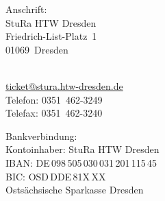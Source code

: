 \documentclass[%
	ngerman,	%
	parskip=half,
	paper=a4,%
	pagesize=auto	%
	]{scrartcl}
\begin{document}
\noindent
\parbox{.3\linewidth}{
Anschrift:\\
StuRa HTW Dresden\\
Friedrich-List-Platz~1\\
01069~Dresden\\
\hspace{0em}
}
\hfill
\parbox{.3\linewidth}{
\hspace{0em}\\
\href{mailto:ticket@stura.htw-dresden.de}{ticket@stura.htw-dresden.de}\\
Telefon: 0351~462-3249\\
Telefax: 0351~462-3240\\
\hspace{0em}
}
\hfill
\parbox{.3\linewidth}{
Bankverbindung:\\
Kontoinhaber: StuRa HTW Dresden\\
IBAN: DE\,098\,505\,030\,031\,201\,115\,45\\
BIC: OSD\,DDE\,81X\,XX\\
Ostsächsische Sparkasse Dresden
}
\end{document}

